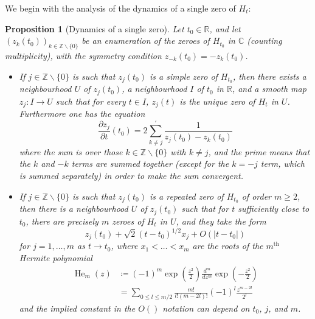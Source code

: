 \documentclass[a4paper,11pt,twoside]{amsart}
\newtheorem{proposition}[theorem]{Proposition}
\newcommand\R{\mathbb{R}}
\newcommand\Z{\mathbb{Z}}
\newcommand\C{\mathbb{C}}
\begin{document}
We begin with the analysis of the dynamics of a single zero of $H_t$:

\begin{proposition}[Dynamics of a single zero]\label{dynam}  Let $t_0 \in \R$, and let $(z_k(t_0))_{k \in \Z \backslash \{0\}}$ be an enumeration of the zeroes of $H_{t_0}$ in $\C$ (counting multiplicity), with the symmetry condition $z_{-k}(t_0) = -z_k(t_0)$.
\begin{itemize}
\item[(i)]  If $j \in \Z \backslash \{0\}$ is such that $z_j(t_0)$ is a simple zero of $H_{t_0}$, then there exists a neighbourhood $U$ of $z_j(t_0)$, a neighbourhood $I$ of $t_0$ in $\R$, and a smooth map $z_j: I \to U$ such that for every $t \in I$, $z_j(t)$ is the unique zero of $H_t$ in $U$.  Furthermore one has the equation
\begin{equation}\label{zjk}
 \frac{\partial z_j}{\partial t}(t_0) = 2 \sum^{\prime}_{k \neq j} \frac{1}{z_j(t_0) - z_k(t_0)} 
\end{equation}
where the sum is over those $k \in \Z \backslash \{0\}$ with $k \neq j$, and the prime means that the $k$ and $-k$ terms are summed together (except for the $k=-j$ term, which is summed separately) in order to make the sum convergent.
\item[(ii)]  If $j \in \Z \backslash \{0\}$ is such that $z_j(t_0)$ is a repeated zero of $H_{t_0}$ of order $m \geq 2$, then there is a neighbourhood $U$ of $z_j(t_0)$ such that for $t$ sufficiently close to $t_0$, there are precisely $m$ zeroes of $H_t$ in $U$, and they take the form
$$ z_j(t_0) + \sqrt{2} (t-t_0)^{1/2} x_j + O( |t-t_0|)$$
for $j=1,\dots,m$ as $t \to t_0$, where $x_1 < \dots < x_m$ are the roots of the $m^{\operatorname{th}}$ Hermite polynomial
\begin{align}
\operatorname{He}_m(z) &\coloneqq (-1)^m \exp\left(\frac{z^2}{2}\right) \frac{d^m}{dz^m} \exp\left(-\frac{z^2}{2}\right)\label{heform}\\
&= \sum_{0 \leq l \leq m/2} \frac{m!}{l! (m-2l)!} (-1)^l \frac{z^{m-2l}}{2^l}\label{heform2}
\end{align}
and the implied constant in the $O()$ notation can depend on $t_0$, $j$, and $m$.
\end{itemize}
\end{proposition}
\end{document}
